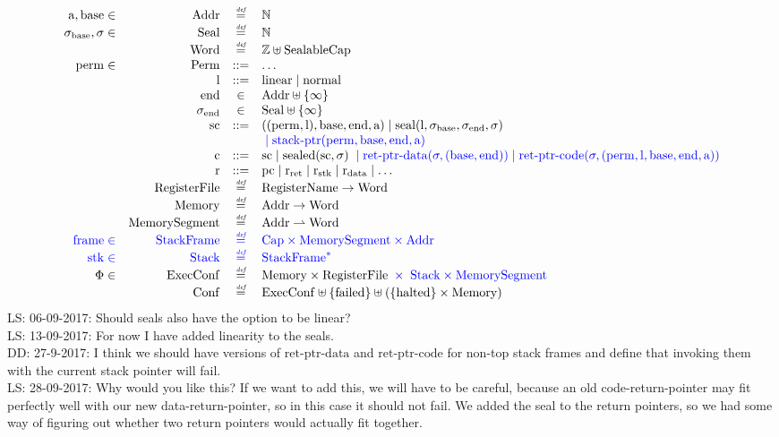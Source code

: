 \documentclass[a3paper]{article}
\newcommand\lau[1]{{\color{purple} \sf \footnotesize {LS: #1}}\\}
\newcommand\dominique[1]{{\color{purple} \sf \footnotesize {DD: #1}}\\}
\newcommand{\defeq}{\stackrel{\textit{\tiny{def}}}{=}}
\newcommand{\defbnf}{::=}
\newcommand{\fun}{\rightarrow}
\newcommand{\parfun}{\rightharpoonup}
\newcommand{\sourcecolor}{\color{blue}}
\newcommand{\src}[1]{{\sourcecolor #1}}
\newcommand{\nats}{\mathbb{N}}
\newcommand{\ints}{\mathbb{Z}}
\newcommand{\shareddom}[1]{\mathrm{#1}}
\newcommand{\RegName}{\shareddom{RegisterName}}
\newcommand{\Addr}{\shareddom{Addr}}
\newcommand{\Seal}{\shareddom{Seal}}
\newcommand{\Perm}{\shareddom{Perm}}
\newcommand{\Caps}{\shareddom{Cap}}
\newcommand{\SealableCaps}{\shareddom{SealableCap}}
\newcommand{\Word}{\shareddom{Word}}
\newcommand{\Mem}{\shareddom{Memory}}
\newcommand{\Reg}{\shareddom{RegisterFile}}
\newcommand{\Conf}{\shareddom{Conf}}
\newcommand{\ExecConf}{\shareddom{ExecConf}}
\newcommand{\MemSeg}{\shareddom{MemorySegment}}
\newcommand{\StkFrame}{\shareddom{StackFrame}}
\newcommand{\Stack}{\shareddom{Stack}}
\newcommand{\scbnf}{\shareddom{sc}}
\newcommand{\cbnf}{\shareddom{c}}
\newcommand{\permbnf}{\shareddom{perm}}
\newcommand{\addrbnf}{\shareddom{a}}
\newcommand{\basebnf}{\shareddom{base}}
\newcommand{\aendbnf}{\shareddom{end}}
\newcommand{\rbnf}{\shareddom{r}}
\newcommand{\linbnf}{\shareddom{l}}
\newcommand{\sealbasebnf}{\sigma_\shareddom{base}}
\newcommand{\sealendbnf}{\sigma_\shareddom{end}}
\newcommand{\sstk}{\shareddom{stk}}
\newcommand{\sstkframe}{\shareddom{frame}}
\newcommand{\stkptr}[1]{\mathrm{stack\text{-}ptr}(#1)}
\newcommand{\retptrd}{\mathrm{ret\text{-}ptr\text{-}data}}
\newcommand{\retptrc}{\mathrm{ret\text{-}ptr\text{-}code}}
\newcommand{\seal}[1]{\shareddom{seal}(#1)}
\newcommand{\sealed}[1]{\shareddom{sealed}(#1)}
\newcommand{\failed}{\mathrm{failed}}
\newcommand{\halted}{\mathrm{halted}}
\newcommand{\pcreg}{\mathrm{pc}}
\newcommand{\rstk}{\mathrm{r}_\mathrm{stk}}
\newcommand{\rO}{\mathrm{r}_\mathrm{ret}}
\newcommand{\rret}{\rO}
\newcommand{\rdata}{\mathrm{r}_\mathrm{data}}
\newcommand{\plainlinearity}[1]{\mathrm{#1}}
\newcommand{\linear}{\plainlinearity{linear}}
\newcommand{\normal}{\plainlinearity{normal}}
\begin{document}
\[
  \begin{array}{rrcl}
   \addrbnf,\basebnf \in & \Addr & \defeq & \nats \\
    \sealbasebnf, \sigma \in & \Seal & \defeq & \nats \\
    &\Word & \defeq & \ints \uplus \SealableCaps\\
    \permbnf \in& \Perm & \defbnf & \dots \\
    &\linbnf & \defbnf & \linear \mid \normal \\
    &\aendbnf & \in & \Addr \uplus \{\infty \} \\
    &\sealendbnf & \in & \Seal \uplus \{\infty \} \\
    &\scbnf &\defbnf & ((\permbnf,\linbnf),\basebnf,\aendbnf,\addrbnf) \mid \seal{\linbnf,\sealbasebnf,\sealendbnf,\sigma}\\
    & & & {\sourcecolor{} \mid \stkptr{\permbnf,\basebnf,\aendbnf,\addrbnf}}\\ 
    &\cbnf & \defbnf &  \scbnf \mid \sealed{\scbnf,\sigma}{\sourcecolor{} \; \mid \retptrd(\sigma,(\basebnf,\aendbnf)) \mid \retptrc(\sigma,(\permbnf,\linbnf,\basebnf,\aendbnf,\addrbnf))}\\ 
    &\rbnf & \defbnf &\pcreg \mid \rret \mid \rstk \mid \rdata \mid \dots \\
    &\Reg & \defeq & \RegName \fun \Word\\
    &\Mem & \defeq & \Addr \fun \Word \\
    &\MemSeg & \defeq & \Addr \parfun \Word \\
    {\sourcecolor \sstkframe \in} & {\sourcecolor \StkFrame} & {\sourcecolor \defeq} & {\sourcecolor \Caps \times \MemSeg \times \Addr}\\
    \src{\sstk \in}& \src{ \Stack} & \src{ \defeq} & \src{ \StkFrame^*} \\
    \Phi \in & \ExecConf & \defeq & \Mem \times \Reg {\sourcecolor{} \; \times \; \Stack \times \MemSeg }\\
    &\Conf & \defeq & \ExecConf \uplus \{\failed\} \uplus (\{\halted\} \times \Mem)
  \end{array}
\]
\lau{06-09-2017: Should seals also have the option to be linear?}
\lau{13-09-2017: For now I have added linearity to the seals.}
\dominique{27-9-2017: I think we should have versions of $\retptrd$ and $\retptrc$ for non-top stack frames and define that invoking them with the current stack pointer will fail.}
\lau{28-09-2017: Why would you like this? If we want to add this, we will have to be careful, because an old code-return-pointer may fit perfectly well with our new data-return-pointer, so in this case it should not fail. We added the seal to the return pointers, so we had some way of figuring out whether two return pointers would actually fit together.}
\end{document}
